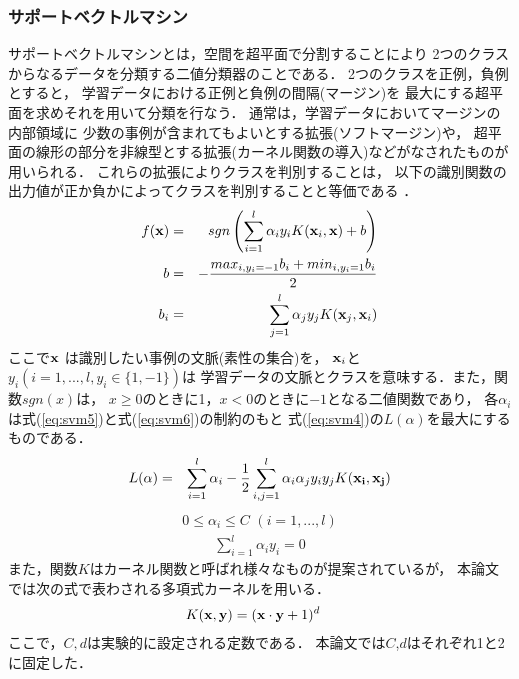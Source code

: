 \subsubsection{サポートベクトルマシン}

サポートベクトルマシンとは，空間を超平面で分割することにより
2つのクラスからなるデータを分類する二値分類器のことである．
2つのクラスを正例，負例とすると，
学習データにおける正例と負例の間隔(マージン)を
最大にする超平面を求めそれを用いて分類を行なう．
通常は，学習データにおいてマージンの内部領域に
少数の事例が含まれてもよいとする拡張(ソフトマージン)や，
超平面の線形の部分を非線型とする拡張(カーネル関数の導入)などがなされたものが
用いられる．
これらの拡張によりクラスを判別することは，
以下の識別関数の出力値が正か負かによってクラスを判別することと等価である
\cite{SVM,kudoh_svm}．
{
\begin{eqnarray}
  \label{eq:svm1}
  f({\bf x}) & = & sgn \left( \sum^{l}_{i=1} \alpha_i y_i K({\bf x}_i,{\bf x}) + b \right)\\
  b & = & -\frac{max_{i,y_i=-1}b_i + min_{i,y_i=1}b_i}{2}\nonumber\\
  b_i & = & \sum^l_{j=1} \alpha_j y_j K({\bf x}_j,{\bf x}_i) \nonumber
\end{eqnarray}
}
ここで${\bf x}$ は識別したい事例の文脈(素性の集合)を，
${\bf x}_{i}$と$y_i(i=1,...,l, y_i\in\{1,-1\})$は
学習データの文脈とクラスを意味する．また，関数$sgn(x)$は，
$x \geq 0$のときに1，$x < 0$のときに$-1$となる二値関数であり，
各$\alpha_i$は式(\ref{eq:svm5})と式(\ref{eq:svm6})の制約のもと
式(\ref{eq:svm4})の$L(\alpha )$を最大にするものである．
{
\begin{eqnarray}
  \label{eq:svm4}
  L({\alpha}) & = & \sum^l_{i=1} \alpha_i - \frac{1}{2} \sum^l_{i,j=1} \alpha_i \alpha_j y_i y_j K({\bf x_i},{\bf x_j})
\end{eqnarray}
}
{
\begin{eqnarray}
  \label{eq:svm5}
  0 \leq \alpha_i \leq C \, \, (i=1,...,l)
\end{eqnarray}
}
{
\begin{eqnarray}
  \label{eq:svm6}
  \sum^l_{i=1} \alpha_i y_i = 0 
\end{eqnarray}
}
また，関数$K$はカーネル関数と呼ばれ様々なものが提案されているが，
本論文では次の式で表わされる多項式カーネルを用いる．
{
\begin{eqnarray}
  \label{eq:svm3}
  K({\bf x},{\bf y}) & = ({\bf x}\cdot{\bf y} + 1)^d
\end{eqnarray}
}
ここで，$C,d$は実験的に設定される定数である．
本論文では$C$,$d$はそれぞれ1と2に固定した．

